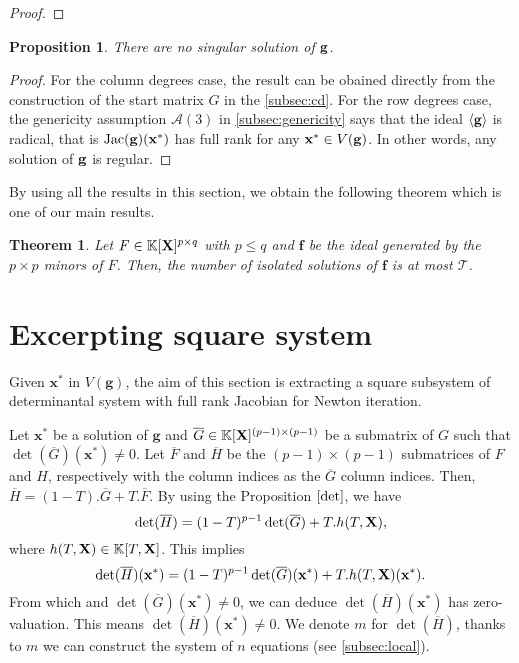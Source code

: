 \documentclass[11pt]{article}
\numberwithin{Property}{section}
\newtheorem{Theorem}{Theorem}%
\numberwithin{Theorem}{section}
\newtheorem{Proposition}{Proposition}%
\numberwithin{Proposition}{section}
\numberwithin{Lemma}{section}
\numberwithin{Corollary}{section}
\numberwithin{Definition}{section}
\numberwithin{Remark}{section}
\numberwithin{Conjecture}{section}
\numberwithin{Problem}{section}
\numberwithin{Claim}{section}
\theoremstyle{definition}
\numberwithin{Example}{section}
\def\f {\ensuremath{\mathbf{f}}}
\def\g {\ensuremath{\mathbf{g}}}
\renewcommand{\leq}{\leqslant}
\def\bar{\overline}
\newcommand{\field}{\mathbb{K}} %
\newcommand{\mat}[1]{\mathbf{\MakeUppercase{#1}}} %
\newcommand{\improve}[1]{\textcolor{blue}{#1}} %
\begin{document}
\begin{proof}
\end{proof}
\begin{Proposition}
There are no singular solution of ${\bf g}$.
\end{Proposition}
\begin{proof}
For the column degrees case, the result can be obained directly from the construction of the start matrix $G$ in the \improve{\cref{subsec:cd}}. For the row degrees case, the genericity assumption $\mathcal{A}(3)$ in \improve{\cref{subsec:genericity}} says that the ideal $\langle {\bf g} \rangle$ is radical, that is $\mathrm{Jac}({\bf g})(\mathbf{x}^*)$ has full rank for any $\mathbf{x}^* \in V({\bf g})$. In other words, any solution of ${\bf g}$ is regular.  
\end{proof}
By using all the results in this section, we obtain the following theorem which is one of our main results.
\begin{Theorem}
Let $F \in \field[\mat{X}]^{p \times q}$ with $p \leq q$ and $\f$ be the ideal generated by the $p \times p$ minors of $F$. Then, the number of isolated solutions of $\f$ is at most $\mathcal{T}$. 
\end{Theorem}
\section{Excerpting square system}
\label{sec:extractsubsystem}
Given $\mathbf{x}^*$ in $V(\g)$, the aim of this section is extracting a square subsystem of determinantal system with full rank Jacobian for Newton iteration. 

Let $\mathbf{x}^*$ be a solution of $\g$ and $\bar{G} \in \field[\mat{X}]^{(p-1) \times (p-1)}$ be a submatrix of $G$ such that $\det(\bar{G})(\mathbf{x}^*) \ne 0$. Let $\bar{F}$ and $\bar{H}$ be the $(p-1) \times (p-1)$ submatrices of $F$ and $H$, respectively with the column indices as the $\bar{G}$ column indices. Then, $\bar{H} = (1-T).\bar{G} + T.\bar{F}$. By using the Proposition $\ref{det}$, we have 
\[
\det(\bar{H}) = (1-T)^{p-1} \det(\bar{G}) + T.h(T,\mat{X}),
\] where $h(T,\mat{X}) \in \field[T,\mat{X}]$. This implies 
\[
\det(\bar{H})(\mathbf{x}^*) = (1-T)^{p-1} \det(\bar{G})(\mathbf{x}^*) + T.h(T,\mat{X})(\mathbf{x}^*). 
\] From which and $\det(\bar{G})(\mathbf{x}^*) \ne 0$, we can deduce $\det(\bar{H})(\mathbf{x}^*)$ has zero-valuation. This means $\det(\bar{H})(\mathbf{x}^*) \ne 0$. We denote $m$ for $\det(\bar{H})$, thanks to $m$ we can construct the system of $n$ equations (see \improve{\cref{subsec:local}}). 
\end{document}
